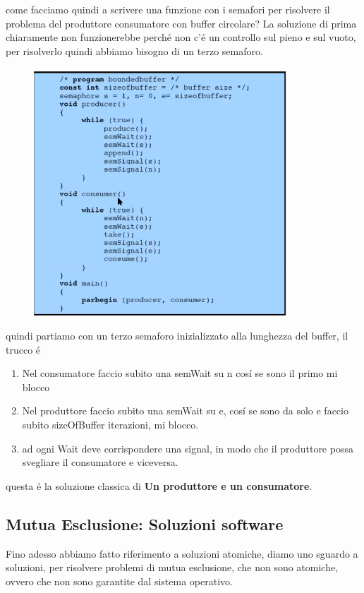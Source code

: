 come facciamo quindi a scrivere una funzione con i semafori per risolvere il problema del produttore consumatore con buffer circolare? La soluzione
di prima chiaramente non funzionerebbe perché non c'é un controllo sul pieno e sul vuoto, per risolverlo quindi abbiamo bisogno di un terzo semaforo.

\begin{figure}[H]
    \centering
    \includegraphics[width=0.7\linewidth]{immagini/ProduttoreConsumatoreConBufferCircolare}
\end{figure}
quindi partiamo con un terzo semaforo inizializzato alla lunghezza del buffer, il trucco é
\begin{enumerate}
    \item Nel consumatore faccio subito una semWait su n cosí se sono il primo mi blocco
    \item Nel produttore faccio subito una semWait su e, cosí se sono da solo e faccio subito sizeOfBuffer iterazioni, mi blocco.
    \item ad ogni Wait deve corrispondere una signal, in modo che il produttore possa svegliare il consumatore e viceversa.
\end{enumerate}
questa é la soluzione classica di \textbf{Un produttore e un consumatore}.
\subsection{Mutua Esclusione: Soluzioni software}
Fino adesso abbiamo fatto riferimento a soluzioni atomiche, diamo uno sguardo a soluzioni, per risolvere
problemi di mutua esclusione, che non sono atomiche, ovvero che non sono garantite dal sistema operativo.

